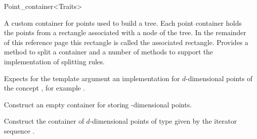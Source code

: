 

\begin{ccRefClass}{Point_container<Traits>}



\begin{ccAdvanced}


\ccDefinition
A custom container for points used to build a tree. Each point container
holds the points from a rectangle associated with a node of the tree.
In the remainder of this reference page this rectangle is called the
associated rectangle.
Provides a method to split a container and a number of methods
to support the implementation of splitting rules.


\ccParameters

Expects for the template argument an implementation for
$d$-dimensional points of the concept , for example
.

\ccTypes


\ccCreation
{}

{
Construct an empty container for storing -dimensional points.
}

{
Construct the container of $d$-dimensional points of type 
given by the iterator sequence \ccc{[begin, end)}.}



\ccOperations


\end{ccAdvanced}
\end{ccRefClass}
